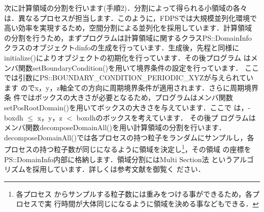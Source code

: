\documentclass[twocolumn,10pt]{jarticle}
\begin{document}
次に計算領域の分割を行います(手順2)．分割によって得られる小領域の各々
は．異なるプロセスが担当します．このように，FDPSでは大規模並列化環境で
高い効率を実現するため，空間分割による並列化を採用しています．計算領域
の分割を行うため，まずプログラムは計算領域に関するクラスPS::DomainInfo
クラスのオブジェクトdinfoの生成を行っています．生成後，先程と同様に
initialize()によりオブジェクトの初期化を行っています．その後プログラム
はメンバ関数setBoundaryCondition()を用いて境界条件の設定を行っています．
ここでは引数にPS::BOUNDARY\_CONDITION\_PERIODIC\_XYZが与えられています
のでx，y，z軸全ての方向に周期境界条件が適用されます．さらに周期境界条
件ではボックスの大きさが必要となるため，プログラムはメンバ関数
setPosRootDomain()を用いてボックスの大きさを与えています．ここで
は，-boxdh $\leq$ x，y，z $<$ boxdhのボックスを考えています． その後プ
ログラムはメンバ関数decomposeDomainAll()を用い計算領域の分割を行います．
decomposeDomainAll()では各プロセスの持つ粒子をランダムにサンプルし，各
プロセスの持つ粒子数が同じになるように領域を決定し\footnote{各プロセス
  からサンプルする粒子数には重みをつける事ができるため，各プロセスで実
  行時間が大体同じになるように領域を決める事などもできる．}，その領域
の座標をPS::DomainInfo内部に格納します．領域分割にはMulti Section法
\cite{MS}というアルゴリズムを採用しています．詳しくは参考文献を御覧く
ださい．
\end{document}
